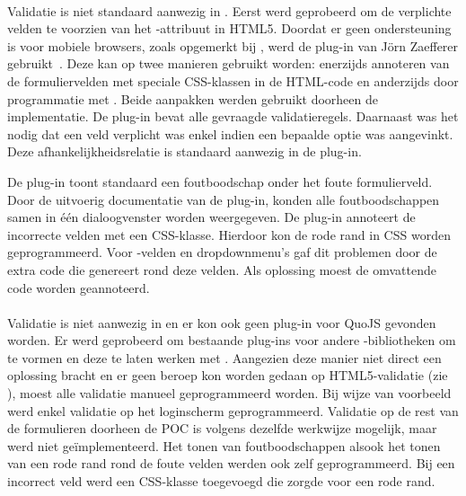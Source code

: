 \paragraph{\jqm}
Validatie is niet standaard aanwezig in \jqm. 
Eerst werd geprobeerd om de verplichte velden te voorzien van het -attribuut in HTML5. 
Doordat er geen ondersteuning is voor mobiele browsers, zoals opgemerkt bij \kendo{}, werd de plug-in van Jörn Zaefferer gebruikt~\cite{Zaefferer2013}. 
Deze kan op twee manieren gebruikt worden: enerzijds annoteren van de formuliervelden met speciale CSS-klassen in de HTML-code en anderzijds door programmatie met \js{}. 
Beide aanpakken werden gebruikt doorheen de implementatie. 
De plug-in bevat alle gevraagde validatieregels.
Daarnaast was het nodig dat een veld verplicht was enkel indien een bepaalde optie was aangevinkt.
Deze afhankelijkheidsrelatie is standaard aanwezig in de plug-in.

De plug-in toont standaard een foutboodschap onder het foute formulierveld.
Door de uitvoerig documentatie van de plug-in, konden alle foutboodschappen samen in één dialoogvenster worden weergegeven.
De plug-in annoteert de incorrecte velden met een CSS-klasse.
Hierdoor kon de rode rand in CSS worden geprogrammeerd. 
Voor -velden en dropdownmenu's gaf dit problemen door de extra code die \jqm{} genereert rond deze velden.
Als oplossing moest de omvattende code worden geannoteerd.

\paragraph{\lungo}
Validatie is niet aanwezig in \lungo{} en er kon ook geen plug-in voor QuoJS gevonden worden.
Er werd geprobeerd om bestaande plug-ins voor andere \js{}-bibliotheken om te vormen en deze te laten werken met \quo{}.
Aangezien deze manier niet direct een oplossing bracht en er geen beroep kon worden gedaan op HTML5-validatie (zie \kendo{}), moest alle validatie manueel geprogrammeerd worden. 
Bij wijze van voorbeeld werd enkel validatie op het loginscherm geprogrammeerd.
Validatie op de rest van de formulieren doorheen de POC is volgens dezelfde werkwijze mogelijk, maar werd niet geïmplementeerd.
Het tonen van foutboodschappen alsook het tonen van een rode rand rond de foute velden werden ook zelf geprogrammeerd.
Bij een incorrect veld werd een CSS-klasse toegevoegd die zorgde voor een rode rand.


\subsection{}
\label{sec:evaluatie-gebruik-handtekening}

